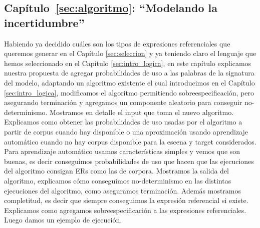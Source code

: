 \subsection{Cap\'itulo~\ref{sec:algoritmo}: ``Modelando la incertidumbre''} 
Habiendo ya decidido cu\'ales son los tipos de expresiones referenciales que queremos generar en el Cap\'itulo \ref{sec:seleccion} y ya teniendo
claro el lenguaje \EL que hemos seleccionado en el Cap\'itulo \ref{sec:intro_logica}, en este cap\'itulo 
explicamos nuestra propuesta de agregar probabilidades de uso a las palabras de la signatura del modelo, adaptando un algoritmo existente 
\cite{areces08} el cual introducimos en el Cap\'itulo \ref{sec:intro_logica}, modificamos el algoritmo permitiendo sobreespecificaci\'on, 
pero asegurando terminaci\'on y agregamos un componente aleatorio para conseguir no-determinismo. Mostramos en detalle el input que toma el
 nuevo algoritmo. Explicamos como obtener las probabilidades de uso usadas por el algoritmo a partir de corpus cuando hay disponible o una aproximaci\'on usando aprendizaje autom\'atico cuando no hay corpus disponible para la escena y target considerados. Para aprendizaje autom\'atico usamos caracter\'isticas simples y vemos que son buenas, es decir conseguimos probabilidades de uso que hacen que las ejecuciones del algoritmo consigan ERs como las de corpora. 
Mostramos la salida del algoritmo, explicamos c\'omo conseguimos no-determinismo en las distintas ejecuciones del algoritmo, como aseguramos 
terminaci\'on. Adem\'as mostramos completitud, es decir que siempre conseguimos la expresi\'on referencial si existe. Explicamos como agregamos sobreespecificaci\'on a las expresiones referenciales. Luego damos un ejemplo de ejecuci\'on. 




